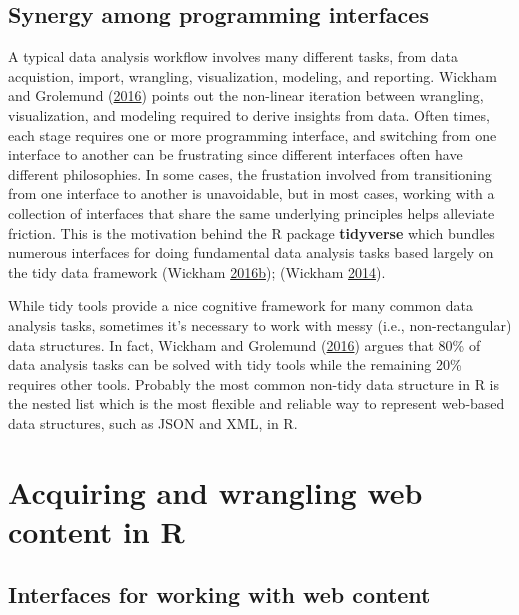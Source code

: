 \documentclass[12pt,]{isuthesis}
\begin{document}
\subsection{Synergy among programming
interfaces}\label{synergy-among-programming-interfaces}

A typical data analysis workflow involves many different tasks, from
data acquistion, import, wrangling, visualization, modeling, and
reporting. Wickham and Grolemund (\protect\hyperlink{ref-r4ds}{2016})
points out the non-linear iteration between wrangling, visualization,
and modeling required to derive insights from data. Often times, each
stage requires one or more programming interface, and switching from one
interface to another can be frustrating since different interfaces often
have different philosophies. In some cases, the frustation involved from
transitioning from one interface to another is unavoidable, but in most
cases, working with a collection of interfaces that share the same
underlying principles helps alleviate friction. This is the motivation
behind the R package \textbf{tidyverse} which bundles numerous
interfaces for doing fundamental data analysis tasks based largely on
the tidy data framework (Wickham
\protect\hyperlink{ref-tidyverse}{2016}\protect\hyperlink{ref-tidyverse}{b});
(Wickham \protect\hyperlink{ref-tidy-data}{2014}).

While tidy tools provide a nice cognitive framework for many common data
analysis tasks, sometimes it's necessary to work with messy (i.e.,
non-rectangular) data structures. In fact, Wickham and Grolemund
(\protect\hyperlink{ref-r4ds}{2016}) argues that 80\% of data analysis
tasks can be solved with tidy tools while the remaining 20\% requires
other tools. Probably the most common non-tidy data structure in R is
the nested list which is the most flexible and reliable way to represent
web-based data structures, such as JSON and XML, in R.

\section{Acquiring and wrangling web content in
R}\label{acquiring-and-wrangling-web-content-in-r}

\subsection{Interfaces for working with web
content}\label{interfaces-for-working-with-web-content}
\end{document}
